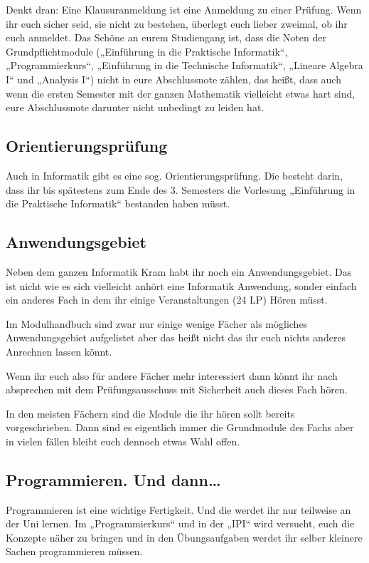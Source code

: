 Denkt dran: Eine Klausuranmeldung ist eine Anmeldung zu einer Prüfung. Wenn ihr
euch sicher seid, sie nicht zu bestehen, überlegt euch lieber zweimal, ob ihr
euch anmeldet. Das Schöne an eurem Studiengang ist, dass die Noten der
Grundpflichtmodule („Einführung in die Praktische Informatik“, „Programmierkurs“,
„Einführung in die Technische Informatik“, „Lineare Algebra I“ und „Analysis I“)
nicht in eure Abschlussnote zählen, das heißt, dass auch
wenn die ersten Semester mit der ganzen Mathematik vielleicht etwas hart sind,
eure Abschlussnote darunter nicht unbedingt zu leiden hat.


\subsection{Orientierungsprüfung}

Auch in Informatik gibt es eine sog. Orientierungsprüfung. Die besteht darin,
dass ihr bis spätestens zum Ende des 3. Semesters die Vorlesung
„Einführung in die Praktische Informatik“ bestanden haben müsst.


\subsection{Anwendungsgebiet}

Neben dem ganzen Informatik Kram habt ihr noch ein Anwendungsgebiet.
Das ist nicht wie es sich vielleicht anhört eine Informatik Anwendung,
sonder einfach ein anderes Fach in dem ihr einige Veranstaltungen (24 \gls{LP}) Hören müsst.

Im Modulhandbuch sind zwar nur einige wenige Fächer als mögliches Anwendungsgebiet aufgelistet
aber das heißt nicht das ihr euch nichts anderes Anrechnen lassen könnt.

Wenn ihr euch also für andere Fächer mehr interessiert dann könnt ihr nach absprechen mit dem Prüfungsausschuss mit Sicherheit auch dieses Fach hören.

In den meisten Fächern sind die Module die ihr hören sollt bereits vorgeschrieben. Dann sind es eigentlich immer die Grundmodule des Fachs aber in vielen fällen bleibt euch dennoch etwas Wahl offen.


\subsection{Programmieren. Und dann\dots}

Programmieren ist eine wichtige Fertigkeit. Und die werdet ihr nur teilweise an
der Uni lernen. Im „Programmierkurs“ und in der „IPI“ wird versucht, euch die
Konzepte näher zu bringen und in den Übungsaufgaben werdet ihr selber kleinere
Sachen programmieren müssen.

